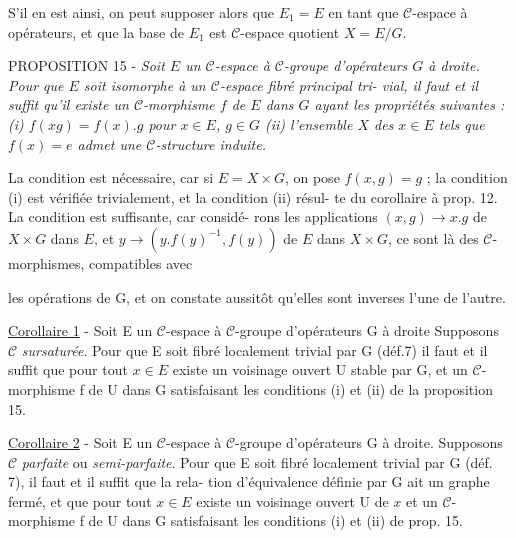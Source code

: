 S'il en est ainsi, on peut supposer alors que $E_1 = E$ en tant que
$\mathcal{C}$-espace à opérateurs, et que la base de $E_1$ est $\mathcal{C}$-espace quotient
$X = E/G$.

PROPOSITION 15 - \emph{Soit $E$ un $\mathcal{C}$-espace à $\mathcal{C}$-groupe d'opérateurs $G$ à
droite. Pour que $E$ soit isomorphe à un $\mathcal{C}$-espace fibré principal tri-
vial, il faut et il suffit qu'il existe un $\mathcal{C}$-morphisme $f$ de $E$ dans $G$
ayant les propriétés suivantes : (i) $f(xg) = f(x).g$ pour $x \in E$, $g \in G$
(ii) l'ensemble $X$ des $x \in E$ tels que $f(x) = e$ admet une $\mathcal{C}$-structure
induite.}

La condition est nécessaire, car si $E = X \times G$, on pose $f(x,g) = g$ ;
la condition (i) est vérifiée trivialement, et la condition (ii) résul-
te du corollaire à prop. 12. La condition est suffisante, car considé-
rons les applications $(x,g) \to x.g$ de $X \times G$ dans $E$, et $y \to (y.f(y)^{-1},
f(y))$ de $E$ dans $X \times G$, ce sont là des $\mathcal{C}$-morphismes, compatibles avec

\newpage



les opérations de G, et on constate aussitôt qu'elles sont inverses
l'une de l'autre.

\underline{Corollaire 1} - Soit E un $\mathcal{C}$-espace à $\mathcal{C}$-groupe d'opérateurs G à droite
Supposons $\mathcal{C}$ \emph{sursaturée}. Pour que E soit fibré localement trivial par
G (déf.7) il faut et il suffit que pour tout $x \in E$ existe un voisinage
ouvert U stable par G, et un $\mathcal{C}$-morphisme f de U dans G satisfaisant
les conditions (i) et (ii) de la proposition 15.

\underline{Corollaire 2} - Soit E un $\mathcal{C}$-espace à $\mathcal{C}$-groupe d'opérateurs G à
droite. Supposons $\mathcal{C}$ \emph{parfaite} ou \emph{semi-parfaite}. Pour que E soit fibré
localement trivial par G (déf. 7), il faut et il suffit que la rela-
tion d'équivalence définie par G ait un graphe fermé, et que pour tout
$x \in E$ existe un voisinage ouvert U de $x$ et un $\mathcal{C}$-morphisme f de U dans
G satisfaisant les conditions (i) et (ii) de prop. 15.

